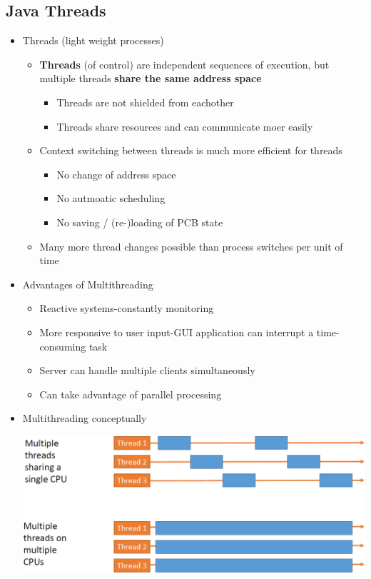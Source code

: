 \documentclass[a4paper]{article}
\begin{document}
\subsection*{Java Threads}
	\begin{itemize}
		\item Threads (light weight processes)
			\begin{itemize}
				\item \textbf{Threads} (of control) are independent sequences of execution, but multiple threads \textbf{share the same address space}
					\begin{itemize}
						\item Threads are not shielded from eachother
						\item Threads share resources and can communicate moer easily
					\end{itemize}
				\item Context switching between threads is much more efficient for threads
					\begin{itemize}
						\item No change of address space
						\item No autmoatic scheduling
						\item No saving / (re-)loading of PCB state
					\end{itemize}
				\item Many more thread changes possible than process switches per unit of time
			\end{itemize}
		\item Advantages of Multithreading
			\begin{itemize}
				\item Reactive systems-constantly monitoring
				\item More responsive to user input-GUI application can interrupt a time-consuming task
				\item Server can handle multiple clients simultaneously
				\item Can take advantage of parallel processing
			\end{itemize}
		\item Multithreading conceptually\\
			\begin{center}
				\includegraphics[scale=1]{Figures/MultithreadingConceptually.jpg}

\end{center}
\end{itemize}
\end{document}
